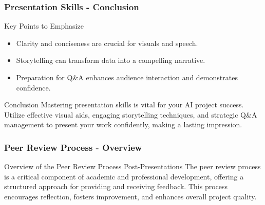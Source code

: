 \documentclass{beamer}
\begin{document}
\begin{frame}[fragile]
    \frametitle{Presentation Skills - Conclusion}
    \begin{block}{Key Points to Emphasize}
        \begin{itemize}
            \item Clarity and conciseness are crucial for visuals and speech.
            \item Storytelling can transform data into a compelling narrative.
            \item Preparation for Q\&A enhances audience interaction and demonstrates confidence.
        \end{itemize}
    \end{block}

    \begin{block}{Conclusion}
        Mastering presentation skills is vital for your AI project success. Utilize effective visual aids, engaging storytelling techniques, and strategic Q\&A management to present your work confidently, making a lasting impression.
    \end{block}
\end{frame}

\begin{frame}[fragile]
    \frametitle{Peer Review Process - Overview}
    \begin{block}{Overview of the Peer Review Process Post-Presentations}
        The peer review process is a critical component of academic and professional development, offering a structured approach for providing and receiving feedback. This process encourages reflection, fosters improvement, and enhances overall project quality.
    \end{block}
\end{frame}
\end{document}
